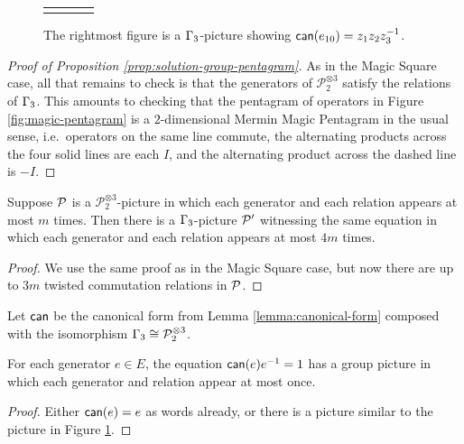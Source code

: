\begin{figure}
\begin{center}
\begin{tabular}{
	m{}
	m{}
	m{}
	m{}
	}
{	        }
	\end{tabular}
	\end{center}
	\caption{
		The rightmost figure is a $\Gamma_3$-picture showing $\operatorname*{\mathsf{can}}(e_{10}) = z_1z_2z_3^{-1}$.
	}
	\label{fig:G3-m0-equals-1}
\end{figure}


\begin{proof}[Proof of Proposition \ref{prop:solution-group-pentagram}]
	As in the Magic Square case, all that remains to check is that the generators of $\mathcal{P}_2^{\otimes 3}$ satisfy the relations of $\Gamma_3$. This amounts to checking that the pentagram of operators in Figure \ref{fig:magic-pentagram} is a $2$-dimensional Mermin Magic Pentagram in the usual sense, i.e.\ operators on the same line commute, the alternating products across the four solid lines are each $I$, and the alternating product across the dashed line is $-I$.
\end{proof}

\begin{lemma}\label{lemma:small-group-pictures-pentagram}
	Suppose $\mathcal P$ is a $\mathcal{P}_2^{\otimes 3}$-picture in which each generator and each relation appears at most $m$ times. Then there is a $\Gamma_3$-picture $\mathcal P'$ witnessing the same equation in which each generator and each relation appears at most $4m$ times.
\end{lemma}
\begin{proof}
	We use the same proof as in the Magic Square case, but now there are up to $3m$ twisted commutation relations in $\mathcal P$.
\end{proof}

Let $\operatorname*{\mathsf{can}}$ be the canonical form from Lemma \ref{lemma:canonical-form} composed with the isomorphism $\Gamma_3 \cong \mathcal{P}_2^{\otimes 3}$.
\begin{lemma}\label{lemma:G3-m0-equals-1}
	For each generator $e\in E$, the equation $\operatorname*{\mathsf{can}}(e)e^{-1} = 1$ has a group picture in which each generator and relation appear at most once. 
\end{lemma}
\begin{proof}

	Either $\operatorname*{\mathsf{can}}(e) = e$ as words already, or there is a picture similar to the picture in Figure \ref{fig:G3-m0-equals-1}.
\end{proof}

